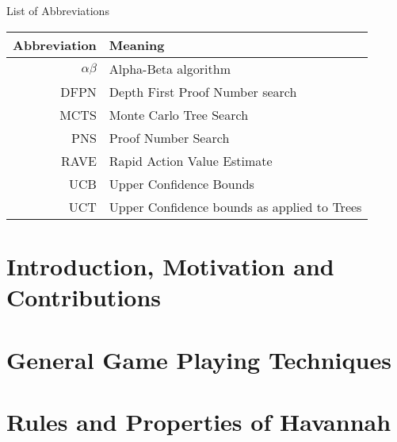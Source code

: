 \documentclass[12pt, letterpaper]{report}
\numberwithin{equation}{section}
\begin{document}
  \section*{}
  \begin{flushright}
    \huge{List of Abbreviations}
  \end{flushright}
  \vspace{0.4in}
  \begin{center}
    \begin{tabular}{rl}
      Abbreviation & Meaning \\
      \hline
      $\alpha\beta$ & Alpha-Beta algorithm \\
      DFPN          & Depth First Proof Number search \\
      MCTS          & Monte Carlo Tree Search \\
      PNS           & Proof Number Search \\
      RAVE          & Rapid Action Value Estimate \\
      UCB           & Upper Confidence Bounds \\
      UCT           & Upper Confidence bounds as applied to Trees \\

    \end{tabular}
  \end{center}  
  
  
  

  \newpage
  \setcounter{page}{1}

  \chapter[Introduction]{\label{intro} \LARGE Introduction, Motivation and Contributions}
  

  \chapter[Background]{\label{background} \LARGE General Game Playing Techniques}
  

  \chapter[Havannah]{\label{havannah} \LARGE Rules and Properties of Havannah}
  
\end{document}
